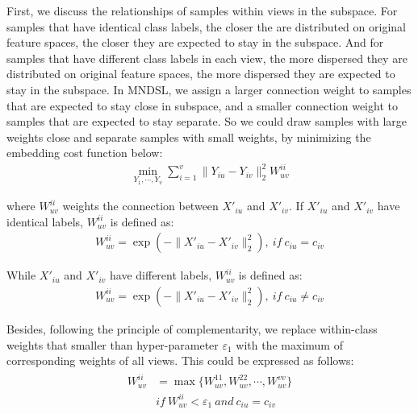 \documentclass[journal]{IEEEtran}
\begin{document}
First, we discuss the relationships of samples within views in the subspace. 
For samples that have identical class labels, the closer the are distributed on original feature spaces, the closer they are expected to stay in the subspace. 
And for samples that have different class labels in each view, the more dispersed they are distributed on original feature spaces, the more dispersed they are expected to stay in the subspace. 
In MNDSL, we assign a larger connection weight to samples that are expected to stay close in subspace, and a smaller connection weight to samples that are expected to stay separate. 
So we could draw samples with large weights close and separate samples with small weights, by minimizing the embedding cost function below: 
\begin{gather}
\min_{Y_1,\cdots, Y_v} \sum_{i=1}^v \|Y_{iu}-Y_{iv} \|_2^2 W_{uv}^{ii}
\label{withinview}
\end{gather}

where $W_{uv}^{ii}$ weights the connection between $X'_{iu}$ and $X'_{iv}$. 
If $X'_{iu}$ and $X'_{iv}$ have identical labels, $W_{uv}^{ii}$ is defined as: 
\begin{align}
W_{uv}^{ii} = 
\exp(-{{\|X'_{iu}-X'_{iv}}\|_2^2}),\ if \ c_{iu}=c_{iv} 
\end{align}

While $X'_{iu}$ and $X'_{iv}$ have different labels, $W_{uv}^{ii}$ is defined as:
\begin{align}
W_{uv}^{ii} = 
\exp(-{{\|X'_{iu}-X'_{iv}}\|_2^2}),\ if \ c_{iu}\neq c_{iv} 
\end{align}

Besides, following the principle of complementarity, we replace within-class weights that smaller than hyper-parameter $\varepsilon_1$ with the maximum of corresponding weights of all views. 
This could be expressed as follows: 
\begin{align}
\begin{split}
W_{uv}^{ii}& = \max\{W_{uv}^{11}, W_{uv}^{22}, \cdots, W_{uv}^{vv} \}\\ 
&if\ W_{uv}^{ii} < \varepsilon_1\ and\ c_{iu}=c_{iv}
\end{split}
\end{align}
\end{document}

